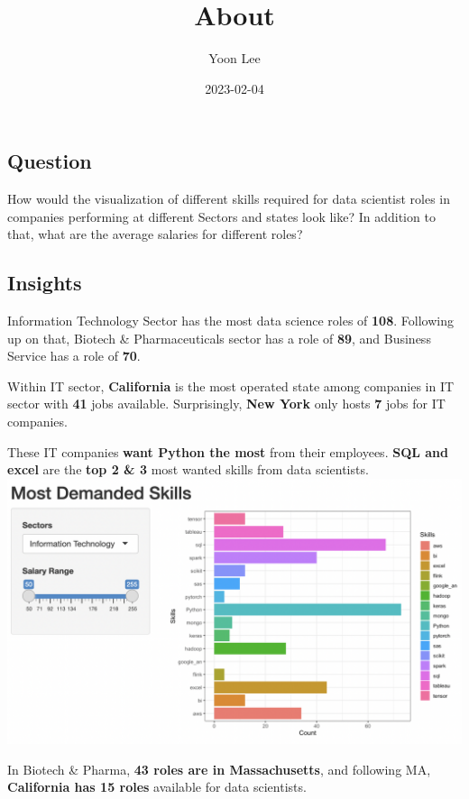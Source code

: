 \documentclass[
]{article}
\title{About}
\author{Yoon Lee}
\date{2023-02-04}
\begin{document}
\maketitle

\hypertarget{question}{%
\subsection{Question}\label{question}}

How would the visualization of different skills required for data
scientist roles in companies performing at different Sectors and states
look like? In addition to that, what are the average salaries for
different roles?

\hypertarget{insights}{%
\subsection{Insights}\label{insights}}

Information Technology Sector has the most data science roles of
\textbf{108}. Following up on that, Biotech \& Pharmaceuticals sector
has a role of \textbf{89}, and Business Service has a role of
\textbf{70}.

Within IT sector, \textbf{California} is the most operated state among
companies in IT sector with \textbf{41} jobs available. Surprisingly,
\textbf{New York} only hosts \textbf{7} jobs for IT companies.

These IT companies \textbf{want Python the most} from their employees.
\textbf{SQL and excel} are the \textbf{top 2 \& 3} most wanted skills
from data scientists. \includegraphics{data/IT-skills.png}

In Biotech \& Pharma, \textbf{43 roles are in Massachusetts}, and
following MA, \textbf{California has 15 roles} available for data
scientists.
\end{document}
